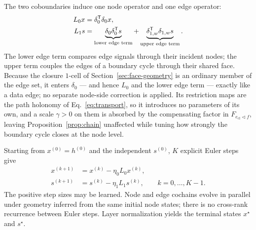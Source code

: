 The two coboundaries induce one node operator and one edge operator:
\begin{align}
  L_0x
  &=\delta_0^{\mathsf{T}}\delta_0x,
  \label{eq:l0}\\
  L_1s
  &=\underbrace{\delta_0\delta_0^{\mathsf{T}}s}_{\text{lower edge term}}
    +\underbrace{\delta_{1,w}^{\mathsf{T}}\delta_{1,w}s}_{\text{upper edge term}} .
  \label{eq:l1}
\end{align}
The lower edge term compares edge signals through their incident nodes; the upper term couples the
edges of a boundary cycle through their shared face.  Because the closure \(1\)-cell of
Section~\ref{sec:face-geometry} is an ordinary member of the edge set, it enters \(\delta_0\) — and hence
\(L_0\) and the lower edge term — exactly like a data edge; no separate node-side correction is
applied.  Its restriction maps are the path holonomy of Eq.~\eqref{eq:transport}, so it introduces
no parameters of its own, and a scale \(\gamma>0\) on them is absorbed by the compensating factor in
\(F_{e_{\mathrm{cl}}\lhd f}\), leaving Proposition~\ref{prop:chain} unaffected while tuning how
strongly the boundary cycle closes at the node level.

Starting from \(x^{(0)}=h^{(0)}\) and the independent \(s^{(0)}\), \(K\) explicit Euler steps give
\begin{equation}
  \begin{aligned}
  x^{(k+1)}&=x^{(k)}-\eta_0L_0x^{(k)},\\
  s^{(k+1)}&=s^{(k)}-\eta_1L_1s^{(k)},
  \qquad k=0,\ldots,K-1 .
  \end{aligned}
  \label{eq:diffusion}
\end{equation}
The positive step sizes may be learned.  Node and edge cochains evolve in parallel under geometry
inferred from the same initial node states; there is no cross-rank recurrence between Euler steps.
Layer normalization yields the terminal states \(x^\star\) and \(s^\star\).

